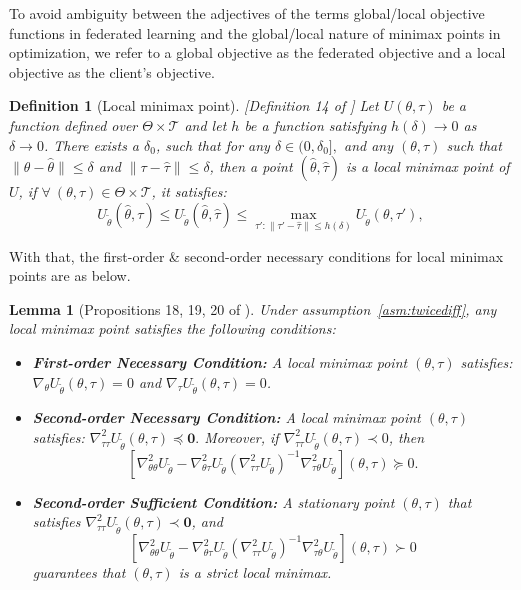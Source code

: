 \documentclass{article}
\let\cite\relax
\newcommand*{\cite}{\citep}
\def\gT{{\mathcal{T}}}
\newtheorem{definition}{Definition}%
\newtheorem{lemma}{Lemma}%
\theoremstyle{definition}
\begin{document}
To avoid ambiguity between the adjectives of the terms global/local objective functions in federated learning and the global/local nature of minimax points in optimization, we refer to a global objective as the federated objective and a local objective as the client's objective.
\begin{definition}[Local minimax point][Definition 14 of \cite{pmlr-v119-jin20e}]
	\label{def:localequilibrium}
	Let $U(\theta, \tau)$ be a function defined over $\Theta \times \mathcal{T} $ and let $h$ be a function satisfying $h(\delta)\rightarrow0$ as $\delta\rightarrow0$. There exists a $\delta_0$, such that for any $\delta\in(0,\delta_0],$ and any $(\theta,\tau)$ such that $\|\theta-\hat\theta\|\leq \delta$ and $\|\tau-\hat\tau\|\leq\delta$, then a point $(\hat\theta,\hat\tau)$ is a local minimax point of $U$, if $\forall~(\theta,\tau)\in\Theta\times\gT$, it satisfies:
		\begin{equation}
			\label{eqn:localequilibrium}
			U_{\tilde\theta}(\hat\theta,\tau)\leq U_{\tilde\theta}(\hat\theta,\hat\tau)\leq \max_{{\tau\prime : \|\tau\prime-\hat\tau\|\leq h(\delta)}}U_{\tilde\theta}(\theta,\tau\prime),
		\end{equation}
\end{definition}
With that, the first-order \& second-order necessary conditions for local minimax points are as below.
\begin{lemma} [Propositions 18, 19, 20 of \cite{pmlr-v119-jin20e}] 
    Under assumption~\ref{asm:twicediff}, any local minimax point satisfies the following conditions:
    \begin{itemize}[parsep=0pt,topsep=0pt,leftmargin=*,itemsep=0pt]
        \item \textbf{First-order Necessary Condition:} A local minimax point $(\theta,\tau)$ satisfies: $\nabla_{\theta}U_{\tilde\theta}(\theta,\tau)=0$ and $\nabla_{\tau}U_{\tilde\theta}(\theta,\tau)=0$.
         \item \textbf{Second-order Necessary Condition:} A local minimax point $(\theta,\tau)$ satisfies: $\nabla_{\tau\tau}^2U_{\tilde\theta}(\theta,\tau)\preceq \mathbf{0}.$ Moreover, if $\nabla_{\tau\tau}^2U_{\tilde\theta}(\theta,\tau)\prec 0$, then
         \begin{equation*}
             \left[\nabla_{\theta\theta}^2U_{\tilde\theta}-\nabla_{\theta\tau}^2U_{\tilde\theta}\left(\nabla_{\tau\tau}^2U_{\tilde\theta}\right)^{-1}\nabla_{\tau\theta}^2U_{\tilde\theta}\right](\theta,\tau)\succeq 0.
    \end{equation*}
        \item \textbf{Second-order Sufficient Condition:} A stationary point $(\theta,\tau)$ that satisfies $\nabla_{\tau\tau}^2U_{\tilde\theta}(\theta,\tau)\prec \mathbf{0}$, and
         \begin{equation*}
			\left[\nabla_{\theta\theta}^2U_{\tilde\theta}-\nabla_{\theta\tau}^2U_{\tilde\theta}\left(\nabla_{\tau\tau}^2U_{\tilde\theta}\right)^{-1}\nabla_{\tau\theta}^2U_{\tilde\theta}\right](\theta,\tau){\succ} 0
		\end{equation*}
        guarantees that $(\theta,\tau)$ is a strict local minimax. 
    \end{itemize}
\end{lemma}
\end{document}
